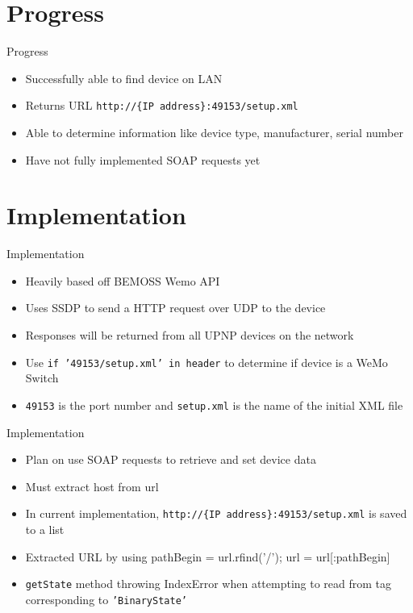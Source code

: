 \documentclass{beamer}
\begin{document}
\section{Progress}
\begin{frame}{Progress}{}
	\begin{itemize}
		\item Successfully able to find device on LAN
		\item Returns URL \texttt{http://\{IP address\}:49153/setup.xml}
		\item Able to determine information like device type, manufacturer, serial number
		\item Have not fully implemented SOAP requests yet
	\end{itemize}
\end{frame}

\section{Implementation}
\begin{frame}{Implementation}{}
	\begin{itemize}
		\item Heavily based off BEMOSS Wemo API
		\item Uses SSDP to send a HTTP request over UDP to the device
		\item Responses will be returned from all UPNP devices on the network
		\item Use \texttt{if '49153/setup.xml' in header} to determine if device is a WeMo Switch
		\item \texttt{49153} is the port number and \texttt{setup.xml} is the name of the initial XML file
	\end{itemize}
\end{frame}

\begin{frame}{Implementation}{}
	\begin{itemize}
		\item Plan on use SOAP requests to retrieve and set device data 
		\item Must extract host from url
		\item In current implementation, \texttt{http://\{IP address\}:49153/setup.xml} is saved to a list
		\item Extracted URL by using pathBegin = url.rfind('/'); url = url[:pathBegin]
		\item \texttt{getState} method throwing IndexError when attempting to read from tag corresponding to \texttt{'BinaryState'}
	\end{itemize}
\end{frame}
\end{document}
